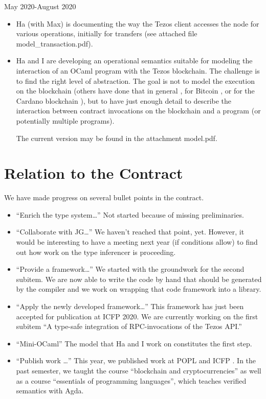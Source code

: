 \documentclass[a4paper,11pt]{article}
\begin{document}
May 2020-August 2020
\begin{itemize}
\item Ha (with Max) is documenting the way the Tezos client accesses the node for various operations, initially for transfers (see attached file model\_transaction.pdf). 
\item Ha and I are developing an operational semantics suitable for modeling the interaction of an OCaml program with the Tezos blockchain. The challenge is to find the right level of abstraction. The goal is not to model the execution on the blockchain (others have done that in general \cite{DBLP:conf/ccs/LuuCOSH16}, for Bitcoin \cite{DBLP:conf/ccs/BartolettiZ18}, or for the Cardano blockchain  \cite{DBLP:conf/fc/ChakravartyCMMPW20}), but to have just enough detail to describe the interaction between contract invocations on the blockchain and a program (or potentially multiple programs).

  The current version may be found in the attachment model.pdf.
\end{itemize}

\section{Relation to the Contract}
\label{sec:relation-contract}

We have made progress on several bullet points in the contract.
\begin{itemize}
\item ``Enrich the type system\dots'' Not started because of missing preliminaries.
\item ``Collaborate with JG\dots'' We haven't reached that point, yet. However, it would be interesting to have a meeting next year (if conditions allow) to find out how work on the type inferencer is proceeding.
\item ``Provide a framework\dots'' We started with the groundwork for the second subitem. We are now able to write the code by hand that should be generated by the compiler and we work on wrapping that code framework into a library.
\item ``Apply the newly developed framework\dots'' This framework has just been accepted for publication at ICFP 2020. We are currently working on the first subitem ``A type-safe integration of RPC-invocations of the Tezos API.''
\item ``Mini-OCaml'' The model that Ha and I work on constitutes the first step.
\item ``Publish work \dots'' This year, we published work at POPL and ICFP \cite{DBLP:journals/pacmpl/ThiemannV20,DBLP:journals/pacmpl/RadanneST20}. In the past semester, we taught the course ``blockchain and cryptocurrencies'' as well as a course ``essentials of programming languages'', which teaches verified semantics with Agda.
\end{itemize}
\end{document}
